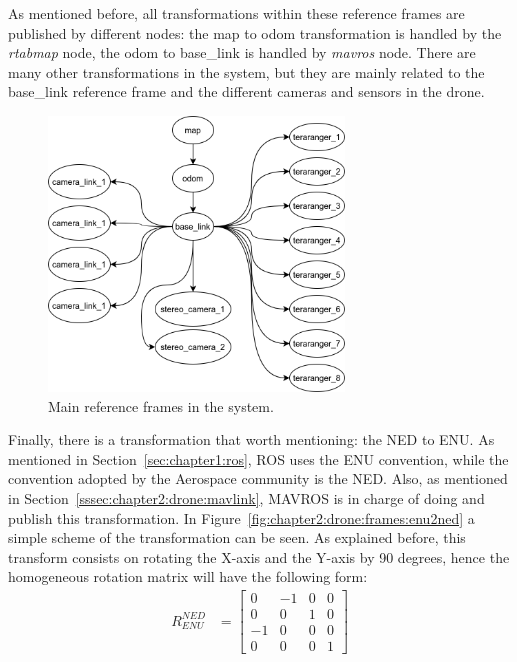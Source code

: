 As mentioned before, all transformations within these reference frames are published by different nodes: the map to odom transformation is handled by the \emph{rtabmap} node, the odom to base\_link is handled by \emph{mavros} node. There are many other transformations in the system, but they are mainly related to the base\_link reference frame and the different cameras and sensors in the drone. \\
\begin{figure}[h]
    \centering
    \includegraphics[width=0.7\textwidth]{Images/fig5-frames.png}
    \caption{Main reference frames in the system.}
    \label{fig:chapter2:drone:frames:frames}
\end{figure}

Finally, there is a transformation that worth mentioning: the \ac{NED} to \ac{ENU}. As mentioned in Section~\ref{sec:chapter1:ros}, \ac{ROS} uses the \ac{ENU} convention, while the convention adopted by the Aerospace community is the \ac{NED}. Also, as mentioned in Section~\ref{sssec:chapter2:drone:mavlink}, MAVROS is in charge of doing and publish this transformation. In Figure~\ref{fig:chapter2:drone:frames:enu2ned} a simple scheme of the transformation can be seen. As explained before, this transform consists on rotating the X-axis and the Y-axis by 90 degrees, hence the homogeneous rotation matrix will have the following form:
\begin{align}
    R_{ENU}^{NED} & = \begin{bmatrix}
        0 & -1 & 0 & 0 \\
        0 & 0 & 1 & 0 \\
        -1 & 0 & 0 & 0 \\
        0 & 0 & 0 & 1
    \end{bmatrix}
\end{align}


